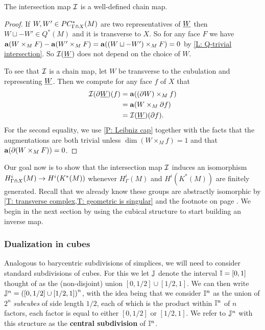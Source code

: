 \begin{proposition}
The intersection map $\mathcal{I}$ is a well-defined chain map.
\end{proposition}
\begin{proof}
If $W, W'\in PC^*_{\Gamma\pitchfork X}(M)$ are two representatives of $\underline{W}$  then $W\sqcup -W'\in Q^*(M)$ and it is transverse to $X$. So for any face $F$ we have $\mathbf{a}(W\times_M F)-\mathbf{a}(W'\times_M F)=\mathbf{a}((W\sqcup -W')\times_M F)=0$ by \cref{L: Q-trivial intersection}. So $\mathcal{I}(\underline{W})$ does not depend on the choice of $W$. 

To see that $\mathcal{I}$ is a chain map, let $W$ be transverse to the cubulation and representing $\underline{W}$. Then we compute for any face $f$ of $X$ that
\begin{align*}
\mathcal{I}(\partial\underline{W})(f)&=\mathbf{a}((\partial W)\times_M f)\\
&=\mathbf{a}(W\times_M \partial f)\\
&=\mathcal{I}(\underline{W})(\partial f).
\end{align*}
For the second equality, we use \cref{P: Leibniz cap} together with the facts that the augmentations are both trivial unless $\dim(W\times_M f)=1$ and that $\mathbf{a}(\partial (W\times_M F))=0$.
\end{proof}



Our goal now is to show that the intersection map $\mathcal{I}$ induces an isomorphism $H^i_{\Gamma \pitchfork X}(M)\to H^i(K^*(M))$ whenever $H^i_\Gamma(M)$ and $H^i(K^*(M))$ are finitely generated. Recall that we already know these groups are abstractly isomorphic by \cref{T: transverse complex,T: geometric is singular} and the footnote on page \pageref{FN: cubical and singular}.  We begin in the next section by using the cubical structure to start building an inverse map.



\subsubsection{Dualization in cubes}\label{S: dual cubes}







Analogous to barycentric subdivisions of simplices, we will need to consider standard subdivisions of cubes. For this we let $\mathbb{J}$ denote the interval $\mathbb{I}=[0,1]$ thought of as the (non-disjoint) union $[0,1/2]\cup [1/2,1]$. We can then write $\mathbb{J}^n=\left([0,1/2]\cup [1/2,1]\right)^n$, with the idea being that we consider $\mathbb{I}^n$ as the union of $2^n$ \textit{subcubes} of side length $1/2$, each of which is the product within $\mathbb{I}^n$ of $n$ factors, each factor is equal to either $[0,1/2]$ or $[1/2,1]$. We refer to $\mathbb{J}^n$ with this structure as the \textbf{central subdivision} of $\mathbb{I}^n$. 

